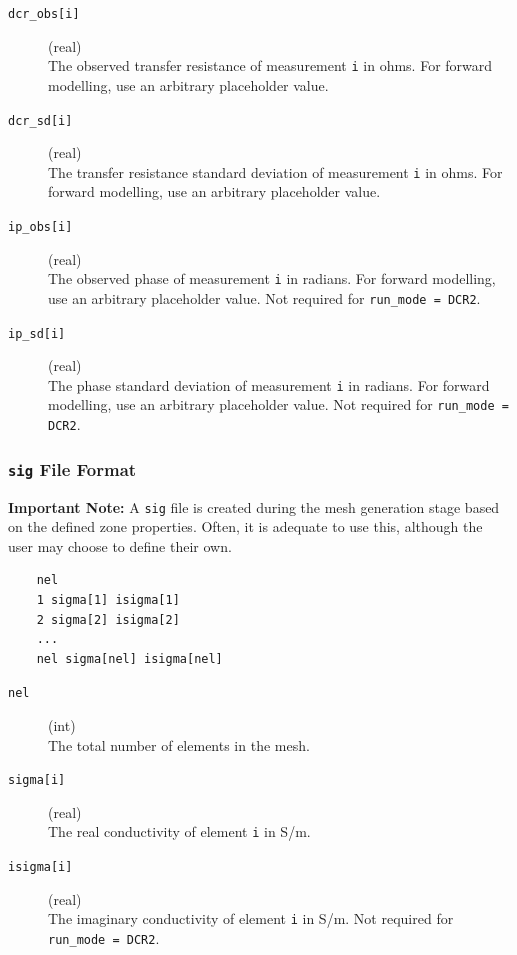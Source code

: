 \documentclass[a4paper,12pt]{article}
\begin{document}
\begin{description}
    \item[\texttt{dcr\_obs[i]}] (real)\hfill \\
    The observed transfer resistance of measurement \texttt{i} in ohms. For forward modelling, use an arbitrary placeholder value.

    \item[\texttt{dcr\_sd[i]}] (real)\hfill \\
    The transfer resistance standard deviation of measurement \texttt{i} in ohms. For forward modelling, use an arbitrary placeholder value.

    \item[\texttt{ip\_obs[i]}] (real)\hfill \\
    The observed phase of measurement \texttt{i} in radians. For forward modelling, use an arbitrary placeholder value. Not required for \texttt{run\_mode = DCR2}.

    \item[\texttt{ip\_sd[i]}] (real)\hfill \\
    The phase standard deviation of measurement \texttt{i} in radians. For forward modelling, use an arbitrary placeholder value. Not required for \texttt{run\_mode = DCR2}.
\end{description}


\newpage
\subsubsection{\texttt{sig} File Format} \label{forward_sig}

\begin{framed}
\noindent \textbf{Important Note:} A \texttt{sig} file is created during the mesh generation stage based on the defined zone properties. Often, it is adequate to use this, although the user may choose to define their own.
\end{framed}

\begin{framed}
\begin{verbatim}
    nel
    1 sigma[1] isigma[1]
    2 sigma[2] isigma[2]
    ...
    nel sigma[nel] isigma[nel]
\end{verbatim}
\end{framed}

\begin{description}
    \item[\texttt{nel}] (int)\hfill \\
    The total number of elements in the mesh.
    
    \item[\texttt{sigma[i]}] (real)\hfill \\
    The real conductivity of element \texttt{i} in S/m.

    \item[\texttt{isigma[i]}] (real)\hfill \\
    The imaginary conductivity of element \texttt{i} in S/m.  Not required for \texttt{run\_mode = DCR2}.
\end{description}
\end{document}
